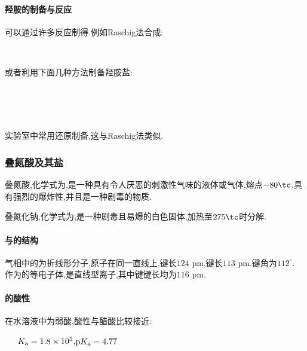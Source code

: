 \documentclass{ctexart}
\begin{document}
\paragraph{羟胺的制备与反应}
可以通过许多反应制得.例如Raschig法合成:
\begin{center}
    \\
\end{center}
或者利用下面几种方法制备羟胺盐:
\begin{center}
     \\
    \\
    \ \ \ \ \ 
\end{center}
实验室中常用还原制备,这与Raschig法类似.
\subsubsection{叠氮酸及其盐}
\begin{substance}[\ce{HN3}]
    叠氮酸,化学式为,是一种具有令人厌恶的刺激性气味的液体或气体,熔点$-80\tc$.具有强烈的爆炸性,并且是一种剧毒的物质.
\end{substance}
\begin{substance}[\ce{NaN3}]
    叠氮化钠,化学式为,是一种剧毒且易爆的白色固体,加热至$275\tc$时分解.
\end{substance}
\paragraph{与的结构}
气相中的为折线形分子,原子在同一直线上,键长$124\text{ pm}$,键长$113\text{ pm}$.键角为$112^\circ$.\\
\indent {}作为的等电子体,是直线型离子,其中键键长均为$116\text{ pm}$.
\paragraph{的酸性}
在水溶液中为弱酸,酸性与醋酸比较接近:
\begin{center}
    \ \ \ $K_\text a=1.8\times10^5$,$\text pK_\text a=4.77$
\end{center}
\end{document}
